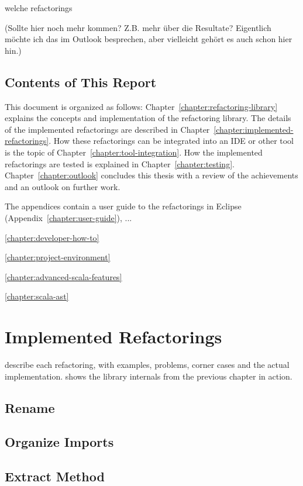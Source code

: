\documentclass[10pt,a4paper,oneside]{scrreprt}
\begin{document}
welche refactorings

(Sollte hier noch mehr kommen? Z.B. mehr \"uber die Resultate? Eigentlich m\"ochte ich das im Outlook besprechen, aber vielleicht geh\"ort es auch schon hier hin.)

\section{Contents of This Report}

This document is organized as follows: Chapter~\vref{chapter:refactoring-library} explains the concepts and implementation of the refactoring library. The details of the implemented refactorings are described in Chapter~\vref{chapter:implemented-refactorings}. How these refactorings can be integrated into an IDE or other tool is the topic of Chapter~\vref{chapter:tool-integration}. How the implemented refactorings are tested is explained in Chapter~\vref{chapter:testing}. Chapter~\vref{chapter:outlook} concludes this thesis with a review of the achievements and an outlook on further work.

The appendices contain a user guide to the refactorings in Eclipse (Appendix~\vref{chapter:user-guide}), ...

\vref{chapter:developer-how-to}

\vref{chapter:project-environment}

\vref{chapter:advanced-scala-features}

\vref{chapter:scala-ast}



\chapter{Implemented Refactorings} \label{chapter:implemented-refactorings}

describe each refactoring, with examples, problems, corner cases and the actual implementation. shows the library internals from the previous chapter in action.

\section{Rename}
\section{Organize Imports}
\section{Extract Method}
\end{document}
